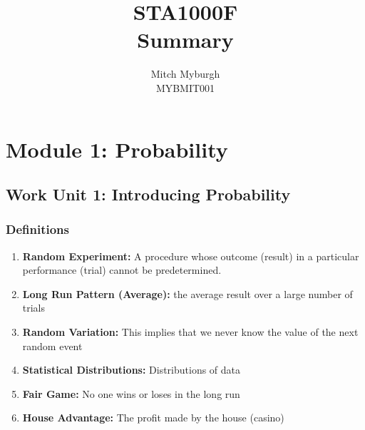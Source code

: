 \documentclass[a4paper,10pt]{article}
\title{STA1000F \\
{\bf Summary} }
\author{Mitch Myburgh \\
MYBMIT001}
\begin{document}
\maketitle



\section{Module 1:  Probability}

\subsection{Work Unit 1: Introducing Probability}
\subsubsection{Definitions}
\begin{enumerate}
\item \textbf{Random Experiment:} A procedure whose outcome (result) in a particular performance (trial) cannot be predetermined.
\item \textbf{Long Run Pattern (Average):} the average result over a large number of trials  
\item \textbf{Random Variation:} This implies that we never know the value of the next random event
\item \textbf{Statistical Distributions:} Distributions of data  
\item \textbf{Fair Game:} No one wins or loses in the long run
 \item \textbf{House Advantage:} The profit made by the house (casino)
\end{enumerate}
\end{document}
